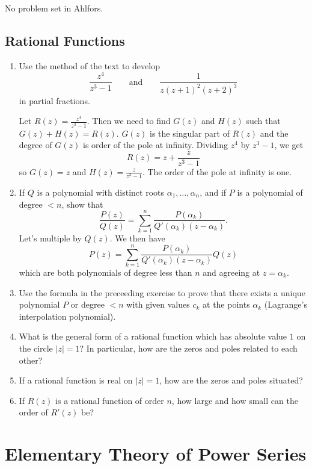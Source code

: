 No problem set in Ahlfors.

\subsection{Rational Functions}

\begin{enumerate}
\item
  Use the method of the text to develop
  \[
  \frac{z^4}{z^3 - 1}\qquad\text{and}\qquad\frac{1}{z(z + 1)^2(z + 2)^3}
  \]
  in partial fractions.
  \par\smallskip
  Let \(R(z) = \frac{z^4}{z^3 - 1}\).
  Then we need to find \(G(z)\) and \(H(z)\) such that \(G(z) + H(z) = R(z)\).
  \(G(z)\) is the singular part of \(R(z)\) and the degree of \(G(z)\) is order
  of the pole at infinity.
  Dividing \(z^4\) by \(z^3 - 1\), we get
  \[
  R(z) = z + \frac{z}{z^3 - 1}
  \]
  so \(G(z) = z\) and \(H(z) = \frac{z}{z^3 - 1}\).
  The order of the pole at infinity is one.
\item
  If \(Q\) is a polynomial with distinct roots \(\alpha_1,\ldots,\alpha_n\),
  and if \(P\) is a polynomial of degree \(< n\), show that
  \[
  \frac{P(z)}{Q(z)} = \sum_{k = 1}^n
  \frac{P(\alpha_k)}{Q'(\alpha_k)(z - \alpha_k)}.
  \]
  Let's multiple by \(Q(z)\).
  We then have
  \[
  P(z) = \sum_{k = 1}^n\frac{P(\alpha_k)}{Q'(\alpha_k)(z - \alpha_k)}Q(z)
  \]
  which are both polynomials of degree less than \(n\) and agreeing at
  \(z = \alpha_k\).
\item
  Use the formula in the preceeding exercise to prove that there exists a
  unique polynomial \(P\) or degree \(< n\) with given values \(c_k\) at the
  points \(\alpha_k\) (Lagrange's interpolation polynomial).
\item
  What is the general form of a rational function which has absolute value
  \(1\) on the circle \(\lvert z\rvert = 1\)?
  In particular, how are the zeros and poles related to each other?
\item
  If a rational function is real on \(\lvert z\rvert = 1\), how are the zeros
  and poles situated?
\item
  If \(R(z)\) is a rational function of order \(n\), how large and how small
  can the order of \(R'(z)\) be?
\end{enumerate}

\section{Elementary Theory of Power Series}

